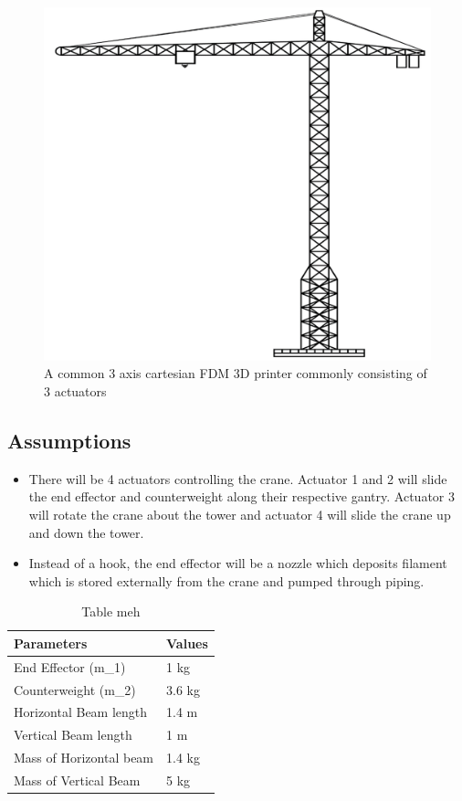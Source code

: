 \documentclass{UoNMCHA}
\numberwithin{equation}{section}
\begin{document}
	\begin{figure}[H]
		\begin{center}
			\includegraphics[width=.8\linewidth]{figs/Picture5}
			\caption{A  common 3 axis cartesian FDM 3D printer commonly consisting of 3 actuators}
			\label{figs/Picture5}
		\end{center}
	\end{figure}
	
	\subsection*{Assumptions}
	\begin{itemize}
		\item There will be 4 actuators controlling the crane. Actuator 1 and 2 will slide the end effector and counterweight along their respective gantry. Actuator 3 will rotate the crane about the tower and actuator 4 will slide the crane up and down the tower. 
		\item Instead of a hook, the end effector will be a nozzle which deposits filament which is stored externally from the crane and pumped through piping.
		
	\end{itemize}
	
	
	\begin{table}[H] \centering 
		\caption{Table meh}
		\begin{tabular}{ll}
			\hline
			Parameters              & Values \\ \hline 
			End Effector (m\_1)     & 1 kg   \\ 
			Counterweight (m\_2)    & 3.6 kg \\ 
			Horizontal Beam length  & 1.4 m  \\ 
			Vertical Beam length    & 1 m    \\ 
			Mass of Horizontal beam & 1.4 kg \\ 
			Mass of Vertical Beam   & 5 kg  
		\end{tabular}
		\label{tab:physical param}
	\end{table}
	
\end{document}
